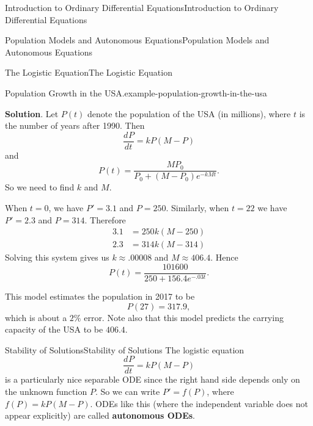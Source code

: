 \documentclass[10pt,]{book}
\newcommand{\terminology}[1]{\textbf{#1}}
\numberwithin{equation}{section}
\newcommand{\dv}[3][]{\dfrac{d^{#1} #2}{d #3^{#1}}}
\begin{document}
\begin{chapterptx}{Introduction to Ordinary Differential Equations}{}{Introduction to Ordinary Differential Equations}{}{}
\begin{sectionptx}{Population Models and Autonomous Equations}{}{Population Models and Autonomous Equations}{}{}
\begin{subsectionptx}{The Logistic Equation}{}{The Logistic Equation}{}{}
\begin{example}{Population Growth in the USA.}{example-population-growth-in-the-usa}
\par\smallskip%
\noindent\textbf{Solution}.\hypertarget{solution-19}{}\quad%
\hypertarget{p-117}{}%
Let \(P(t)\) denote the population of the USA (in millions), where \(t\) is the number of years after 1990. Then%
\begin{equation*}
\dv{P}{t} = kP(M-P)
\end{equation*}
and%
\begin{equation*}
P(t) = \frac{MP_{0}}{P_{0} + (M - P_{0})e^{-kMt}}.
\end{equation*}
So we need to find \(k\) and \(M\).%
\par
\hypertarget{p-118}{}%
When \(t = 0\), we have \(P' = 3.1\) and \(P = 250\). Similarly, when \(t = 22\) we have \(P' = 2.3\) and \(P = 314\). Therefore%
\begin{align*}
3.1 & = 250k(M - 250) \\
2.3 & = 314k(M - 314) 
\end{align*}
Solving this system gives us \(k\approx.00008\) and \(M \approx 406.4\). Hence%
\begin{equation*}
P(t) = \frac{101600}{250 + 156.4e^{-.03t}}.
\end{equation*}
%
\par
\hypertarget{p-119}{}%
This model estimates the population in 2017 to be%
\begin{equation*}
P(27) = 317.9,
\end{equation*}
which is about a \(2\%\) error. Note also that this model predicts the carrying capacity of the USA to be \(406.4\).%
\end{example}
\end{subsectionptx}
%
%
\typeout{************************************************}
\typeout{************************************************}
%
\begin{subsectionptx}{Stability of Solutions}{}{Stability of Solutions}{}{}\label{section-stability-of-solutions}
\hypertarget{p-120}{}%
The logistic equation%
\begin{equation*}
\dv{P}{t} = kP(M-P)
\end{equation*}
is a particularly nice separable ODE since the right hand side depends only on the unknown function \(P\). So we can write \(P' = f(P)\), where \(f(P) = kP(M-P)\). ODEs like this (where the independent variable does not appear explicitly) are called \terminology{autonomous ODEs}.%
\par
\hypertarget{p-121}{}%

\end{subsectionptx}
\end{sectionptx}
\end{chapterptx}
\end{document}
